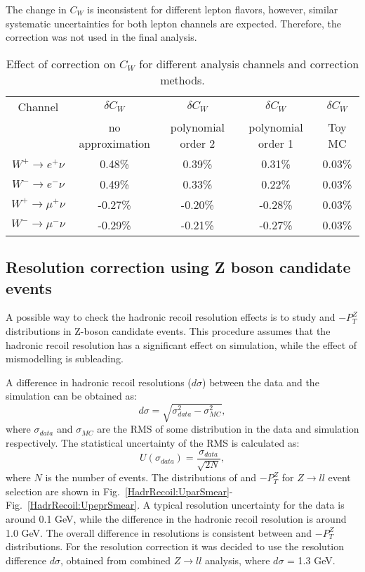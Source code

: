 The change in $C_W$ is inconsistent for different lepton flavors, however, similar systematic uncertainties for both lepton channels are expected. Therefore, the correction was not used in the final analysis.

 \begin{table}[!t]
 \caption{Effect of \sumet correction on $C_{W}$ for different analysis channels and \sumet correction methods.}
\label{SumetCW}
\begin{center}
\begin{tabular}{c | c | c |  c |  c   }
\hline
Channel & $\delta C_W$ & $\delta C_W$ & $\delta C_W$ & $\delta C_W$ \\
& no approximation & polynomial order 2 & polynomial order 1 & Toy MC \\
\hline
\hline
$W^{+} \to e^{+}\nu$ & 0.48\% &0.39\%  & 0.31\% & 0.03\% \\
$W^{-} \to e^{-}\nu$ & 0.49\% &0.33\%  & 0.22\% & 0.03\% \\
$W^{+} \to \mu^{+}\nu$ & -0.27\% &-0.20\%  & -0.28\% & 0.03\% \\
$W^{-} \to \mu^{-}\nu$ & -0.29\% &-0.21\%  & -0.27\% & 0.03\% \\
\hline
\end{tabular}
\end{center}

\end{table}


\subsection{Resolution correction using Z boson candidate events}\label{sec:ZperpSmear}

A possible way to check the hadronic recoil resolution effects is to study \uperp and \upar  $ - P_T^{Z}$ distributions in Z-boson candidate events. This procedure assumes that the hadronic recoil resolution has a significant effect on simulation, while the effect of \sumet mismodelling is subleading.

A difference in hadronic recoil resolutions ($d\sigma$) between the data and the simulation can be obtained as:
\begin{equation}
d\sigma=\sqrt{\sigma_{data}^2-\sigma_{MC}^2},
\end{equation}
where $\sigma_{data}$ and $\sigma_{MC}$ are the RMS of some distribution in the data and simulation respectively. The statistical uncertainty of the RMS is calculated as\cite{AdvStat}:
\begin{equation}
U( \sigma_{data} ) = \frac{\sigma_{data}}{\sqrt{2N} },
\end{equation}
where $N$ is the number of events. The distributions of \uperp and \upar  $ - P_T^{Z}$ for $Z\to ll$ event selection are shown in Fig.~\ref{HadrRecoil:UparSmear}-Fig.~\ref{HadrRecoil:UpeprSmear}. A typical resolution uncertainty for the data is around 0.1 GeV, while the difference in the hadronic recoil resolution is around 1.0 GeV. The overall difference in resolutions is consistent between \uperp and \upar  $ - P_T^{Z}$ distributions. For the resolution correction it was decided to use the resolution difference $d\sigma$, obtained from combined $Z\to ll$ analysis, where $d\sigma$ = 1.3 GeV.

